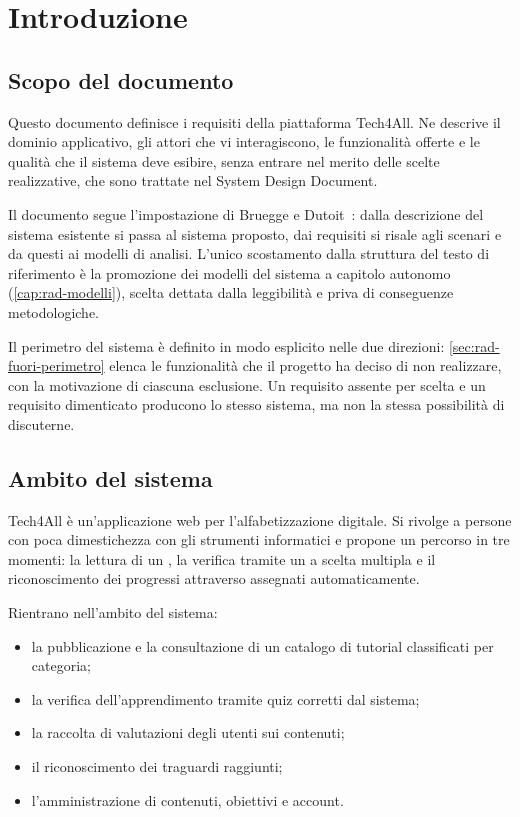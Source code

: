 \chapter{Introduzione}
\label{cap:rad-introduzione}

\section{Scopo del documento}

Questo documento definisce i requisiti della piattaforma Tech4All. Ne descrive
il dominio applicativo, gli attori che vi interagiscono, le funzionalità
offerte e le qualità che il sistema deve esibire, senza entrare nel merito
delle scelte realizzative, che sono trattate nel System Design Document.

Il documento segue l'impostazione di Bruegge e Dutoit~\cite{bruegge2010}: dalla
descrizione del sistema esistente si passa al sistema proposto, dai requisiti
si risale agli scenari e da questi ai modelli di analisi. L'unico scostamento
dalla struttura del testo di riferimento è la promozione dei modelli del
sistema a capitolo autonomo (\cref{cap:rad-modelli}), scelta dettata dalla
leggibilità e priva di conseguenze metodologiche.

Il perimetro del sistema è definito in modo esplicito nelle due direzioni:
\cref{sec:rad-fuori-perimetro} elenca le funzionalità che il progetto ha
deciso di non realizzare, con la motivazione di ciascuna esclusione. Un
requisito assente per scelta e un requisito dimenticato producono lo stesso
sistema, ma non la stessa possibilità di discuterne.

\section{Ambito del sistema}

Tech4All è un'applicazione web per l'alfabetizzazione digitale. Si rivolge a
persone con poca dimestichezza con gli strumenti informatici e propone un
percorso in tre momenti: la lettura di un , la verifica
tramite un  a scelta multipla e il riconoscimento dei progressi
attraverso  assegnati automaticamente.

Rientrano nell'ambito del sistema:

\begin{itemize}
  \item la pubblicazione e la consultazione di un catalogo di tutorial
        classificati per categoria;
  \item la verifica dell'apprendimento tramite quiz corretti dal sistema;
  \item la raccolta di valutazioni degli utenti sui contenuti;
  \item il riconoscimento dei traguardi raggiunti;
  \item l'amministrazione di contenuti, obiettivi e account.
\end{itemize}

